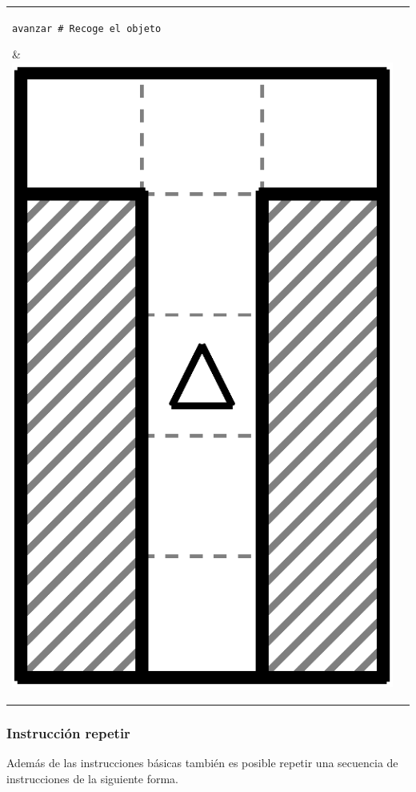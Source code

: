 \documentclass{oci}
\newcommand*{\tabbox}[2][t]{\vspace{0pt}\parbox[#1][2.3\baselineskip]{20em}{\strut#2\strut}}
\begin{document}
\begin{problemDescription}
\begin{center}
\begin{tabular}{|V|V|}
    \tabbox{\texttt{avanzar \# Recoge el objeto}}     &\includegraphics[angle=90, scale=0.25]{laberintos/ejemplo1-4.eps}\\
    \hline
  \end{tabular}
\end{center}



\subsubsection*{Instrucción repetir}
Además de las instrucciones básicas también es posible repetir una secuencia de instrucciones de la siguiente forma.


\end{problemDescription}
\end{document}
